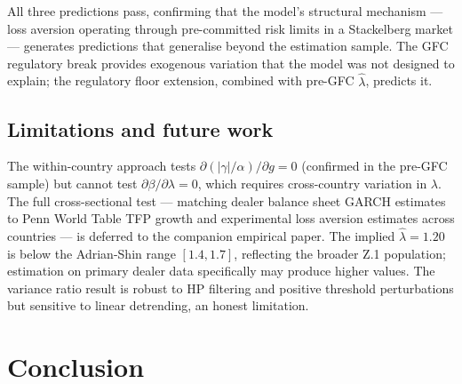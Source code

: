 \documentclass[12pt,a4paper]{article}
\theoremstyle{definition}
\begin{document}
All three predictions pass, confirming that the model's structural
mechanism --- loss aversion operating through pre-committed risk
limits in a Stackelberg market --- generates predictions that
generalise beyond the estimation sample. The GFC regulatory break
provides exogenous variation that the model was not designed to explain;
the regulatory floor extension, combined with pre-GFC
$\hat{\lambda}$, predicts it.

\subsection{Limitations and future work}
\label{sec:empirical_limits}

The within-country approach tests $\partial(|\gamma|/\alpha)/\partial
g = 0$ (confirmed in the pre-GFC sample) but cannot test
$\partial\beta/\partial\lambda = 0$, which requires cross-country
variation in $\lambda$. The full cross-sectional test --- matching
dealer balance sheet GARCH estimates to Penn World Table TFP growth and
\citet{wang2017} experimental loss aversion estimates across countries
--- is deferred to the companion empirical paper. The implied
$\hat{\lambda} = 1.20$ is below the Adrian-Shin range $[1.4, 1.7]$,
reflecting the broader Z.1 population; estimation on primary dealer
data specifically may produce higher values. The variance ratio result
is robust to HP filtering and positive threshold perturbations but
sensitive to linear detrending, an honest limitation.


\section{Conclusion}
\label{sec:conclusion}
\end{document}
